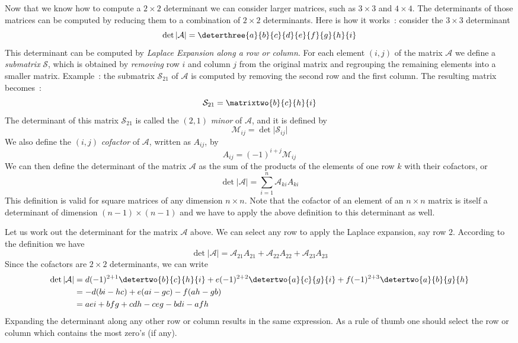 Now that we know how to compute a $2\times 2$ determinant we can consider larger matrices, such as $3\times 3$ and $4\times 4$.
The determinants of those matrices can be computed by reducing them to a combination of $2\times 2$ determinants.  Here is how it works~:
consider the $3\times 3$ determinant 
\[
\det\vert\mathcal{A}\vert=\deterthree{a}{b}{c}{d}{e}{f}{g}{h}{i}
\]
This determinant can be computed by \textit{Laplace Expansion along a row or column}.  
For each element $(i,j)$  of the matrix $\mathcal{A}$ we define a \textit{submatrix} $\mathcal{S}$, which is obtained 
by \textit{removing}  row $i$ and  column $j$ from the original matrix and regrouping the remaining elements into a smaller
matrix.  Example~: the submatrix $\mathcal{S}_{21}$ of $\mathcal{A}$ is computed by removing the second row and the first column.
The resulting matrix becomes~:
\[
\mathcal{S}_{21}=\matrixtwo{b}{c}{h}{i}
\]
The determinant of this matrix $\mathcal{S}_{21}$ is called the $(2,1)$ \textit{minor} of $\mathcal{A}$, and it is defined by
\begin{equation}
\mathcal{M}_{ij}=\det\vert\mathcal{S}_{ij}\vert
\end{equation}
We also define the $(i,j)$ \textit{cofactor} of $\mathcal{A}$, written as $A_{ij}$, by
\begin{equation}
A_{ij}=(-1)^{i+j}\mathcal{M}_{ij}
\end{equation}
We can then define the determinant of the matrix $\mathcal{A}$ as the sum of the products of the elements of one row $k$ with their cofactors, or
\begin{equation}
\det\vert\mathcal{A}\vert=\sum_{i=1}^{n}\mathcal{A}_{ki}A_{ki}
\end{equation}
This definition is valid for square matrices of any dimension $n\times n$.  Note that the cofactor of an element of an $n\times n$ matrix is 
itself a determinant of dimension $(n-1)\times (n-1)$ and we have to apply the above definition to this determinant as well.  

Let us work out the determinant for the matrix $\mathcal{A}$ above.  We can select any row to apply the Laplace expansion, say row $2$.
According to the definition we have
\[
\det\vert\mathcal{A}\vert=\mathcal{A}_{21}A_{21}+\mathcal{A}_{22}A_{22}+\mathcal{A}_{23}A_{23}
\]
Since the cofactors are $2\times 2$ determinants, we can write
\begin{align}
\det\vert\mathcal{A}\vert&=d(-1)^{2+1}\detertwo{b}{c}{h}{i}+e(-1)^{2+2}\detertwo{a}{c}{g}{i}+f(-1)^{2+3}\detertwo{a}{b}{g}{h}\nonumber\\
&=-d(bi-hc)+e(ai-gc)-f(ah-gb)\nonumber\\
&=aei+bfg+cdh-ceg-bdi-afh\nonumber
\end{align}
Expanding the determinant along any other row or column results in the same expression.  As a rule of thumb one should select the row or 
column which contains the most zero's (if any).  

